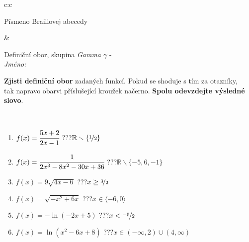 \documentclass[10pt]{report}
\begin{document}
\begin{tabular}{c:c}
\begin{minipage}[c][104.5mm][t]{0.5\linewidth}
\begin{center}
\begin{minipage}{0.20\linewidth}
\begin{center}
{\small Písmeno Braillovej abecedy}
\end{center}
\end{minipage}
\end{center}
\end{minipage}
&
\begin{minipage}[c][104.5mm][t]{0.5\linewidth}
\begin{center}
\vspace{7mm}
{\huge Definiční obor, skupina \textit{Gamma $\gamma$} -}\\[5mm]
\textit{Jméno:}\phantom{xxxxxxxxxxxxxxxxxxxxxxxxxxxxxxxxxxxxxxxxxxxxxxxxxxxxxxxxxxxxxxxxx}\\[5mm]
\begin{minipage}{0.95\linewidth}
\begin{center}
\textbf{Zjisti definiční obor} zadaných funkcí. Pokud se shoduje s tím za otazníky,\\tak napravo obarvi příslušející kroužek načerno. \textbf{Spolu odevzdejte výsledné slovo}.
\end{center}
\end{minipage}
\\[1mm]
\begin{minipage}{0.79\linewidth}
\begin{center}
\begin{varwidth}{\linewidth}
\begin{enumerate}
\normalsizerrr
\item $f(x)=\cfrac{5x+2}{2x-1}$\quad \dotfill\; ???\;\dotfill \quad $\mathbb{R}\smallsetminus\{\nicefrac{1}{2}\}$
\item $f(x)=\cfrac{1}{2x^3-8x^2-30x+36}$\quad \dotfill\; ???\;\dotfill \quad $\mathbb{R}\smallsetminus\{-5,6,-1\}$
\item $f(x)=9\sqrt{4x-6}$\quad \dotfill\; ???\;\dotfill \quad $x\geq\nicefrac{3}{2}$
\item $f(x)=\sqrt{-x^2+6x}$\quad \dotfill\; ???\;\dotfill \quad $x\in\langle-6 , 0\rangle$
\item $f(x)=-\ln{(-2x+5)}$\quad \dotfill\; ???\;\dotfill \quad $x<\nicefrac{-5}{2}$
\item $f(x)=\ln{(x^2-6x+8)}$\quad \dotfill\; ???\;\dotfill \quad $x\in(-\infty , 2)\cup(4 , \infty)$
\end{enumerate}
\end{varwidth}
\end{center}
\end{minipage}
\begin{minipage}{0.20\linewidth}
\begin{center}

\end{center}
\end{minipage}
\end{center}
\end{minipage}
\end{tabular}
\end{document}
